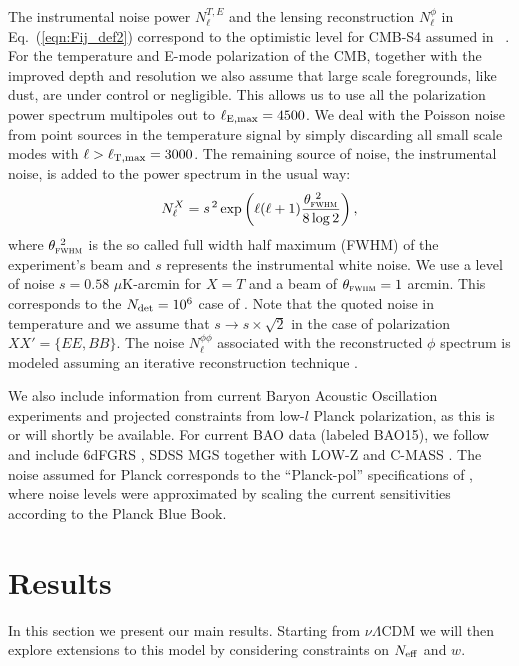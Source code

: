 \documentclass[aps,prd,reprint,superscriptaddress,nofootinbib,floatfix]{revtex4-1}
\newcommand\refeq[1]{Eq.~(\ref{eqn:#1})}
\begin{document}
The instrumental noise power $N_{\ell}^{T,E}$ and the lensing reconstruction $N_{\ell}^{\phi}$ in \refeq{Fij_def2} correspond to the optimistic level for CMB-S4 assumed in ~\cite{2013arXiv1309.5383A,wu:2014,2013PhRvD..87h3008H}.
For the temperature and E-mode polarization of the CMB, together with the improved depth and resolution we also assume that large scale foregrounds, like dust, are under control or negligible. This allows us to use all the polarization power spectrum multipoles out to $\ell_{\rm E,max}=4500$. We deal with the Poisson noise from point sources in the temperature signal by simply discarding all small scale modes with $\ell>\ell_{\rm T,max}=3000$.
The remaining source of noise, the instrumental noise, is added to the power spectrum in the usual way:
 \begin{equation}
 	\centering
		N^{X}_\ell = s^{\, 2} \exp \left(\ell(\ell+1) \frac{\theta^{\ 2}_{\textsc{fwhm}}}{8\log2}\right),
	\label{eq:beamnoise}
\end{equation}
where $\theta^{\ 2}_{\textsc{fwhm}}$ is the so called full width half maximum (FWHM) of the experiment's beam and $s$ represents the instrumental white noise.
We use a level of noise $s = 0.58$ $\mu$K-arcmin for $X=T$ and a beam of $\theta_{\textsc{fwhm}}=1$ arcmin. This corresponds to the $N_{\rm det}=10^{6}$ case of \cite{wu:2014}. 
Note that the quoted noise in temperature and we assume that $s \rightarrow s\times \sqrt{2}$ in the case of polarization $ XX' = \{ EE, BB \}$. 
The noise $N_\ell^{\phi\phi}$ associated with the reconstructed $\phi$ spectrum is modeled assuming an iterative reconstruction technique \cite{seljak:2004}. 

We also include information from current Baryon Acoustic Oscillation experiments and projected constraints from low-$l$ Planck polarization, as this is or will shortly be available.
For current BAO data (labeled BAO15), we follow \cite{allison:2015} and include 6dFGRS \cite{beutler:2011}, SDSS MGS \cite{ross:2015} together with LOW-Z and C-MASS \cite{anderson:2014}.
The noise assumed for Planck corresponds to the ``Planck-pol'' specifications of \cite{allison:2015}, where noise levels were approximated by scaling the current sensitivities according to the Planck Blue Book.


\section{Results \label{sec:results}}
In this section we present our main results. Starting from $\nu \Lambda$CDM we will then explore extensions to this model by considering constraints on $N_{\rm eff}$ and $w$.
\end{document}
